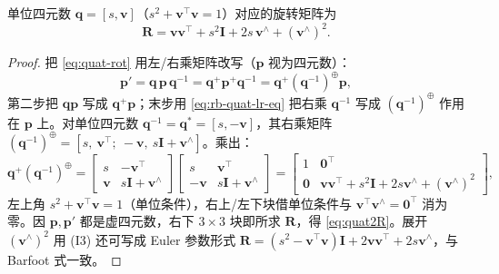 \begin{theorem}\label{thm:quat2R}
单位四元数 $\mathbf{q}=[s,\mathbf{v}]$（$s^2+\mathbf{v}^\top\mathbf{v}=1$）对应的旋转矩阵为
\begin{equation}
  \mathbf{R}=\mathbf{v}\mathbf{v}^\top+s^2\mathbf{I}+2s\,\mathbf{v}^\wedge+(\mathbf{v}^\wedge)^2.
  \label{eq:quat2R}
\end{equation}
\end{theorem}
\begin{proof}
把 \cref{eq:quat-rot} 用左/右乘矩阵改写（$\mathbf{p}$ 视为四元数）：
\[
  \mathbf{p}'=\mathbf{q}\,\mathbf{p}\,\mathbf{q}^{-1}=\mathbf{q}^{+}\mathbf{p}^{+}\mathbf{q}^{-1}=\mathbf{q}^{+}(\mathbf{q}^{-1})^{\oplus}\mathbf{p},
\]
第二步把 $\mathbf{q}\mathbf{p}$ 写成 $\mathbf{q}^{+}\mathbf{p}$；末步用 \cref{eq:rb-quat-lr-eq} 把右乘 $\mathbf{q}^{-1}$ 写成 $(\mathbf{q}^{-1})^{\oplus}$ 作用在 $\mathbf{p}$ 上。对单位四元数 $\mathbf{q}^{-1}=\mathbf{q}^*=[s,-\mathbf{v}]$，其右乘矩阵 $(\mathbf{q}^{-1})^{\oplus}=[s,\ \mathbf{v}^\top;\ -\mathbf{v},\ s\mathbf{I}+\mathbf{v}^\wedge]$。乘出：
\[
  \mathbf{q}^{+}(\mathbf{q}^{-1})^{\oplus}
  =\begin{bmatrix}s&-\mathbf{v}^\top\\\mathbf{v}&s\mathbf{I}+\mathbf{v}^\wedge\end{bmatrix}
  \begin{bmatrix}s&\mathbf{v}^\top\\-\mathbf{v}&s\mathbf{I}+\mathbf{v}^\wedge\end{bmatrix}
  =\begin{bmatrix}1&\mathbf{0}^\top\\\mathbf{0}&\mathbf{v}\mathbf{v}^\top+s^2\mathbf{I}+2s\mathbf{v}^\wedge+(\mathbf{v}^\wedge)^2\end{bmatrix},
\]
左上角 $s^2+\mathbf{v}^\top\mathbf{v}=1$（单位条件），右上/左下块借单位条件与 $\mathbf{v}^\top\mathbf{v}^\wedge=\mathbf{0}^\top$ 消为零。因 $\mathbf{p},\mathbf{p}'$ 都是虚四元数，右下 $3\times3$ 块即所求 $\mathbf{R}$，得 \cref{eq:quat2R}。展开 $(\mathbf{v}^\wedge)^2$ 用 (I3) 还可写成 Euler 参数形式 $\mathbf{R}=(s^2-\mathbf{v}^\top\mathbf{v})\mathbf{I}+2\mathbf{v}\mathbf{v}^\top+2s\mathbf{v}^\wedge$，与 Barfoot 式一致\cite{barfoot2024state}。
\end{proof}

